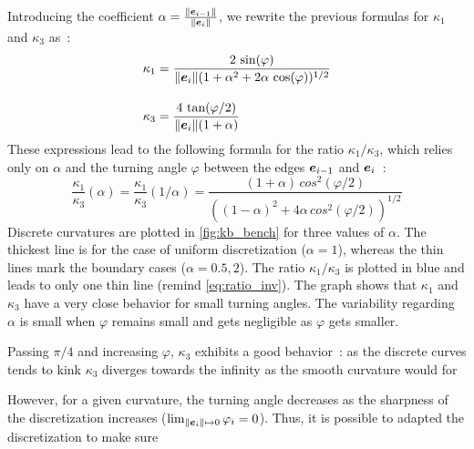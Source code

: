 Introducing the coefficient $\alpha = \frac{\lVert\boldsymbol{e}_{i-1}\rVert}{\lVert\boldsymbol{e}_{i}\rVert}$, we rewrite the previous formulas for $\kappa_1$ and $\kappa_3$ as~:
\begin{equation}
\begin{aligned}
	\kappa_1 &= \frac{2 \,\sin(\varphi)}{\lVert\boldsymbol{e}_{i}\rVert(1+ \alpha^2 + 2 \alpha \, \cos(\varphi))^{1/2}} \\[10pt]
	\kappa_3 &= \frac{4 \,\tan(\varphi/2)}{\lVert\boldsymbol{e}_{i}\rVert(1+\alpha)}
\end{aligned}
\end{equation}
These expressions lead to the following formula for the ratio $\kappa_1 / \kappa_3$, which relies only on $\alpha$ and the turning angle $\varphi$ between the edges $\boldsymbol{e}_{i-1}$ and $\boldsymbol{e}_{i}$~:
\begin{equation}
	\frac{\kappa_1}{\kappa_3}(\alpha) = \frac{\kappa_1}{\kappa_3}(1/\alpha)= \frac{(1+\alpha)\,cos^2(\varphi/2)}{((1- \alpha)^2 + 4 \alpha \, cos^2(\varphi/2))^{1/2}}
	\label{eq:ratio_inv}
\end{equation}
Discrete curvatures are plotted in \cref{fig:kb_bench} for three values of $\alpha$. The thickest line is for the case of uniform discretization ($\alpha=1$), whereas the thin lines mark the boundary cases ($\alpha=0.5,2$). The ratio $\kappa_1/\kappa_3$ is plotted in blue and leads to only one thin line (remind \cref{eq:ratio_inv}). The graph shows that $\kappa_1$ and $\kappa_3$ have a very close behavior for small turning angles. The variability regarding $\alpha$ is small when $\varphi$ remains small and gets negligible as $\varphi$ gets smaller.

Passing $\pi/4$ and increasing $\varphi$, $\kappa_3$ exhibits a good behavior~: as the discrete curves tends to kink $\kappa_3$ diverges towards the infinity as the smooth curvature would for  




However, for a given curvature, the turning angle decreases as the sharpness of the discretization increases ($\lim_{\lVert\boldsymbol{e}_i\rVert \mapsto 0} \varphi_i = 0$). Thus, it is possible to adapted the discretization to make sure

